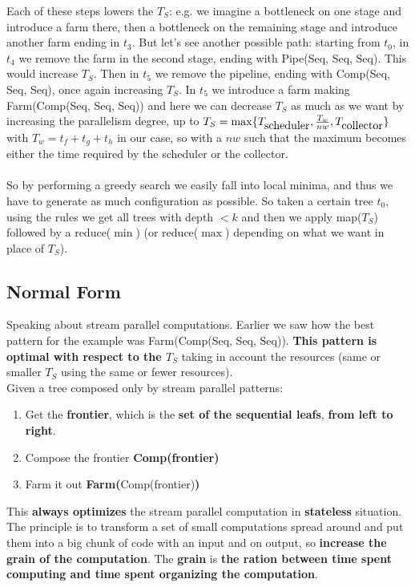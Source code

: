 \documentclass[10pt]{report}
\begin{document}
Each of these steps lowers the $T_S$: e.g. we imagine a bottleneck on one stage and introduce a farm there, then a bottleneck on the remaining stage and introduce another farm ending in $t_3$. But let's see another possible path: starting from $t_0$, in $t_4$ we remove the farm in the second stage, ending with Pipe(Seq, Seq, Seq). This would increase $T_S$. Then in $t_5$ we remove the pipeline, ending with Comp(Seq, Seq, Seq), once again increasing $T_S$. In $t_5$ we introduce a farm making Farm(Comp(Seq, Seq, Seq)) and here we can decrease $T_S$ as much as we want by increasing the parallelism degree, up to $T_S=\max\{T_{\hbox{scheduler}}, \frac{T_w}{nw}, T_{\hbox{collector}}\}$ with $T_w = t_f+t_g+t_h$ in our case, so with a $nw$ such that the maximum becomes either the time required by the scheduler or the collector.\\\\
So by performing a greedy search we easily fall into local minima, and thus we have to generate as much configuration as possible. So taken a certain tree $t_0$, using the rules we get all trees with depth $< k$ and then we apply map($T_S$) followed by a reduce($\min$) (or reduce($\max$) depending on what we want in place of $T_S$).
\subsection{Normal Form}
Speaking about stream parallel computations. Earlier we saw how the best pattern for the example was Farm(Comp(Seq, Seq, Seq)). \textbf{This pattern is optimal with respect to the $T_S$} taking in account the resources (same or smaller $T_S$ using the same or fewer resources).\\
Given a tree composed only by stream parallel patterns:
\begin{enumerate}
	\item Get the \textbf{frontier}, which is the \textbf{set of the sequential leafs}, \textbf{from left to right}.
	\item Compose the frontier \textbf{Comp(frontier)}
	\item Farm it out \textbf{Farm(}Comp(frontier)\textbf{)}
\end{enumerate}
This \textbf{always optimizes} the stream parallel computation in \textbf{stateless} situation. The principle is to transform a set of small computations spread around and put them into a big chunk of code with an input and on output, so \textbf{increase the grain of the computation}. The \textbf{grain} is \textbf{the ration between time spent computing and time spent organizing the computation}.
\end{document}
